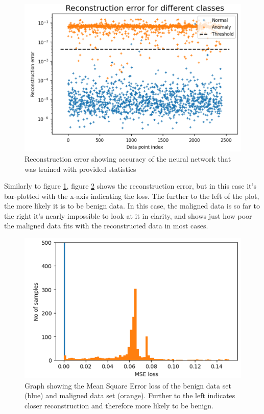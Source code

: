 \documentclass[conference,12pt]{IEEEtran}
\begin{document}
\begin{figure}[H]
    \centering
    \includegraphics[scale=0.4]{Project-Results/Reconstruction-Error.png}
    \caption{Reconstruction error showing accuracy of the neural network that was trained with provided statistics}
    \label{fig:reconstruction-error}
\end{figure}

Similarly to figure \ref{fig:reconstruction-error}, figure \ref{fig:mse-loss} shows the reconstruction error, but in this case it's bar-plotted with the x-axis indicating the loss. The further to the left of the plot, the more likely it is to be benign data. In this case, the maligned data is so far to the right it's nearly impossible to look at it in clarity, and shows just how poor the maligned data fits with the reconstructed data in most cases.

\begin{figure}[H]
    \centering
    \includegraphics[scale=0.6]{Project-Results/MSE-Loss.png}
    \caption{Graph showing the Mean Square Error loss of the benign data set (blue) and maligned data set (orange). Further to the left indicates closer reconstruction and therefore more likely to be benign.}
    \label{fig:mse-loss}
\end{figure}
\end{document}

